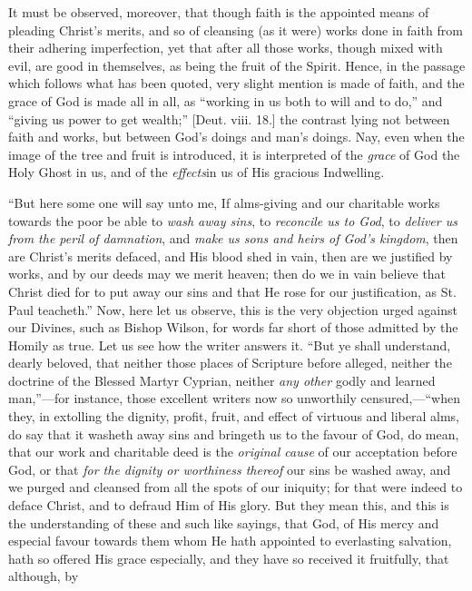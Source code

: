 It must be observed, moreover, that though faith is
the appointed means of pleading Christ's merits, and so of cleansing
(as it were) works done in faith from their adhering imperfection, yet
that after all those works, though mixed with evil, are good in
themselves, as being the fruit of the Spirit. Hence, in the passage
which follows what has been quoted, very slight mention is made of
faith, and the grace of God is made all in all, as ``working in us
both to will and to do,'' and ``giving us power to get
wealth;'' [Deut. viii. 18.] the contrast lying not between faith
and works, but between God's doings and man's doings. Nay, even
when the image of the tree and fruit is introduced, it is interpreted
of the \emph{grace} of God the Holy Ghost in us, and of the \emph{effects}in us of His gracious Indwelling.

``But here some one will say unto me, If alms-giving and our
charitable works towards the poor be able to \emph{wash away sins}, to
\emph{reconcile us to God}, to \emph{deliver us from the peril of
damnation}, and \emph{make us sons and heirs of God's kingdom},
then are Christ's merits defaced, and His blood shed in vain, then
are we justified by works, and by our deeds may we merit heaven; then
do we in vain believe that Christ died for to put away our sins and
that He rose for our justification, as St. Paul teacheth.'' Now,
here let us observe, this is the very objection urged against our
Divines, such as Bishop Wilson, for words far short of those admitted
by the Homily as true. Let us see how the writer answers it. ``But
ye shall understand, dearly beloved, that neither those places of
Scripture before alleged, neither the doctrine of the Blessed Martyr
Cyprian, neither \emph{any other} godly and learned man,''—for
instance, those excellent writers now so unworthily censured,—``when
they, in extolling the dignity, profit, fruit, and effect of virtuous
and liberal alms, do say that it washeth away sins and bringeth us to
the favour of God, do mean, that our work and charitable deed is the \emph{original
cause} of our acceptation before God, or that \emph{for the dignity or
worthiness thereof} our sins be washed away, and we purged and
cleansed from all the spots of our iniquity; for that were indeed to
deface Christ, and to defraud Him of His glory. But they mean this,
and this is the understanding of these and such like sayings, that
God, of His mercy and especial favour towards them whom He hath
appointed to everlasting salvation, hath so offered His grace
especially, and they have so received it fruitfully, that although, by
